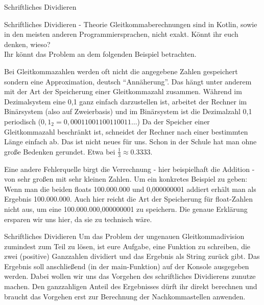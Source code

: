 \begin{task}[points=auto]{Schriftliches Dividieren}
    \begin{subtask*}[points=0]{Schriftliches Dividieren - Theorie }
        Gleitkommaberechnungen sind in Kotlin, sowie in den meisten anderen Programmiersprachen, nicht exakt. Könnt ihr euch denken, wieso?\\
        Ihr könnt das Problem an dem folgenden Beispiel betrachten.

        \begin{solution}
            Bei Gleitkommazahlen werden oft nicht die angegebene Zahlen gespeichert sondern eine Approximation, deutsch \enquote{Annäherung}. Das hängt unter anderem mit der Art der Speicherung einer Gleitkommazahl zusammen. Während im Dezimalsystem eine 0,1 ganz einfach darzustellen ist, arbeitet der Rechner im Binärsystem (also auf Zweierbasis) und im Binärsystem ist die Dezimalzahl 0,1 periodisch ($0,1_2=0,00011001100110011 \dots$) Da der Speicher einer Gleitkommazahl beschränkt ist, schneidet der Rechner nach einer bestimmten Länge einfach ab.
            Das ist nicht neues für uns. Schon in der Schule hat man ohne
            große Bedenken gerundet. Etwa bei $ $.

            Eine andere Fehlerquelle birgt die Verrechnung - hier beispielhaft die Addition - von sehr großen mit sehr kleinen Zahlen. Um ein konkretes Beispiel zu geben: Wenn man die beiden floats 100.000.000 und 0,000000001 addiert erhält man als Ergebnis 100.000.000. Auch hier reicht die Art der Speicherung für float-Zahlen nicht aus, um eine 100.000.000,000000001 zu speichern. Die genaue Erklärung ersparen wir uns hier, da sie zu technisch wäre.
        \end{solution}
    \end{subtask*}
    \begin{subtask*}[points=0]{Schriftliches Dividieren }
        Um das Problem der ungenauen Gleitkommadivision zumindest zum Teil zu lösen, ist eure Aufgabe, eine Funktion zu schreiben, die zwei (positive) Ganzzahlen dividiert und das Ergebnis als String zurück gibt. Das Ergebnis soll anschließend (in der main-Funktion) auf der Konsole ausgegeben werden. Dabei wollen wir uns das Vorgehen des schriftliches Dividierens zunutze machen. Den ganzzahligen Anteil des Ergebnisses dürft ihr direkt berechnen und braucht das Vorgehen erst zur Berechnung der Nachkommastellen anwenden.


\end{subtask*}
\end{task}
